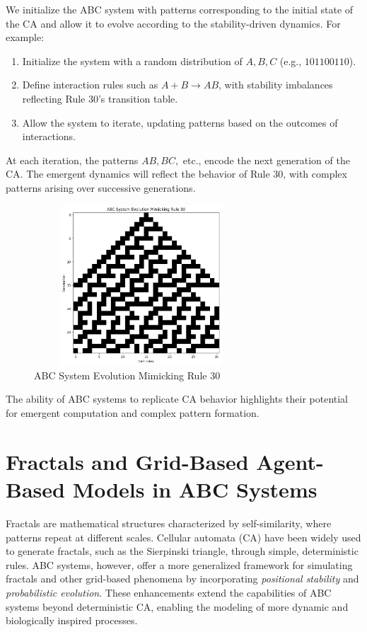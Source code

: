 \documentclass[entropy,article,submit,pdftex,moreauthors]{Definitions/mdpi}
\begin{document}
We initialize the ABC system with patterns corresponding to the initial state of the CA and allow it to evolve according to the stability-driven dynamics. For example:
\begin{enumerate}
    \item Initialize the system with a random distribution of \( A, B, C \) (e.g., \( 101100110 \)).
    \item Define interaction rules such as \( A + B \to AB \), with stability imbalances reflecting Rule 30’s transition table.
    \item Allow the system to iterate, updating patterns based on the outcomes of interactions.
\end{enumerate}

At each iteration, the patterns \( AB, BC, \) etc., encode the next generation of the CA. The emergent dynamics will reflect the behavior of Rule 30, with complex patterns arising over successive generations.

\begin{figure}[htp]
    \centering
    \includegraphics[width=8cm,height=6cm]{ca_1}
    \caption{ABC System Evolution Mimicking Rule 30}
    \label{fig:ca_1}
\end{figure}

The ability of ABC systems to replicate CA behavior highlights their potential for emergent computation and complex pattern formation.

\section{Fractals and Grid-Based Agent-Based Models in ABC Systems}

Fractals are mathematical structures characterized by self-similarity, where patterns repeat at different scales. Cellular automata (CA) have been widely used to generate fractals, such as the Sierpinski triangle, through simple, deterministic rules. ABC systems, however, offer a more generalized framework for simulating fractals and other grid-based phenomena by incorporating \textit{positional stability} and \textit{probabilistic evolution}. These enhancements extend the capabilities of ABC systems beyond deterministic CA, enabling the modeling of more dynamic and biologically inspired processes.
\end{document}
